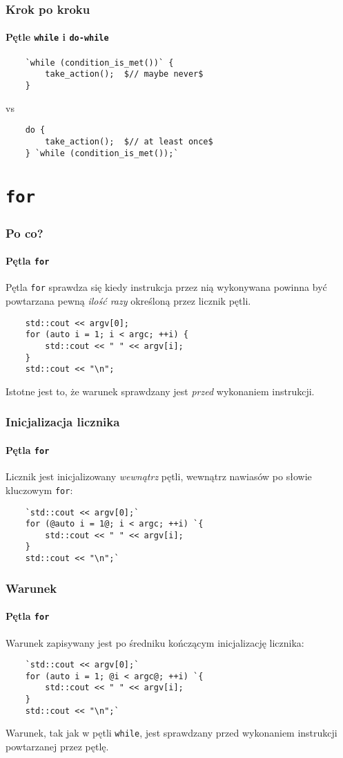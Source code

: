 \documentclass[aspectratio=169]{beamer}
\begin{document}
\begin{frame}[fragile]
    \frametitle{Krok po kroku}
    \framesubtitle{Pętle {\tt while} i {\tt do-while}}

    \begin{lstlisting}
    `while (condition_is_met())` {
        take_action();  $// maybe never$
    }
    \end{lstlisting}

    vs

    \begin{lstlisting}
    do {
        take_action();  $// at least once$
    } `while (condition_is_met());`
    \end{lstlisting}
\end{frame}

\section{{\tt for}}

\begin{frame}[fragile]
    \frametitle{Po co?}
    \framesubtitle{Pętla {\tt for}}

    Pętla {\tt for} sprawdza się kiedy instrukcja przez nią wykonywana powinna
    być powtarzana pewną \emph{ilość razy} określoną przez licznik pętli.

    \begin{lstlisting}
    std::cout << argv[0];
    for (auto i = 1; i < argc; ++i) {
        std::cout << " " << argv[i];
    }
    std::cout << "\n";
    \end{lstlisting}

    Istotne jest to, że warunek sprawdzany jest \emph{przed} wykonaniem
    instrukcji.
\end{frame}

\begin{frame}[fragile]
    \frametitle{Inicjalizacja licznika}
    \framesubtitle{Pętla {\tt for}}

    Licznik jest inicjalizowany \emph{wewnątrz} pętli, wewnątrz nawiasów po
    słowie kluczowym {\tt for}:

    \begin{lstlisting}
    `std::cout << argv[0];`
    for (@auto i = 1@; i < argc; ++i) `{
        std::cout << " " << argv[i];
    }
    std::cout << "\n";`
    \end{lstlisting}
\end{frame}

\begin{frame}[fragile]
    \frametitle{Warunek}
    \framesubtitle{Pętla {\tt for}}

    Warunek zapisywany jest po średniku kończącym inicjalizację licznika:

    \begin{lstlisting}
    `std::cout << argv[0];`
    for (auto i = 1; @i < argc@; ++i) `{
        std::cout << " " << argv[i];
    }
    std::cout << "\n";`
    \end{lstlisting}

    Warunek, tak jak w pętli {\tt while}, jest sprawdzany przed wykonaniem
    instrukcji powtarzanej przez pętlę.
\end{frame}
\end{document}
